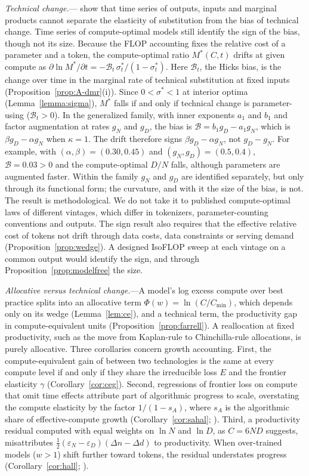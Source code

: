 \emph{Technical change.}---\citet{diamond1978measurement} show that time series of outputs, inputs and marginal
products cannot separate the elasticity of substitution from the bias of technical change. Time series of
compute-optimal models still identify the sign of the bias, though not its size. Because the FLOP accounting fixes the relative cost of a
parameter and a token, the compute-optimal ratio $M^*(C,t)$ drifts at given compute as
$\partial\ln M^*/\partial t=-\mathcal B_t\,\sigma^*_t/(1-\sigma^*_t)$. Here $\mathcal B_t$, the Hicks bias, is the
change over time in the marginal rate of technical substitution at fixed inputs (Proposition~\ref{prop:A-dmr}(i)).
Since $0<\sigma^*<1$ at interior optima (Lemma~\ref{lemma:sigma}), $M^*$ falls if and only if technical change is
parameter-using ($\mathcal B_t>0$). In the generalized family, with inner exponents $a_1$ and $b_1$ and factor augmentation at rates
$g_N$ and $g_D$, the bias is $\mathcal B=b_1g_D-a_1g_N$, which is $\beta g_D-\alpha g_N$ when $\kappa=1$. The drift
therefore signs $\beta g_D-\alpha g_N$, not $g_D-g_N$. For example, with $(\alpha,\beta)=(0.30,0.45)$ and
$(g_N,g_D)=(0.5,0.4)$, $\mathcal B=0.03>0$ and the compute-optimal $D/N$ falls, although parameters are augmented faster.
Within the family $g_N$ and $g_D$ are identified separately, but only through its functional form; the curvature, and
with it the size of the bias, is not. The result is methodological. We do not take it to published compute-optimal laws
of different vintages, which differ in tokenizers, parameter-counting conventions and outputs. The sign result also
requires that the effective relative cost of tokens not drift through data costs, data constraints or serving demand
(Proposition~\ref{prop:wedge}). A designed IsoFLOP sweep at each vintage on a common output would identify the sign,
and through Proposition~\ref{prop:modelfree} the size.

\emph{Allocative versus technical change.}---A model's log excess compute over best practice splits into an allocative
term $\Phi(w)=\ln(C/C_{\min})$, which depends only on its wedge (Lemma~\ref{lem:ce}), and a technical term, the
productivity gap in compute-equivalent units (Proposition~\ref{prop:farrell}). A reallocation at fixed productivity,
such as the move from Kaplan-rule to Chinchilla-rule allocations, is purely allocative. Three corollaries concern
growth accounting. First, the compute-equivalent gain of \citet{gundlach2025origin} between two technologies is the
same at every compute level if and only if they share the irreducible loss $E$ and the frontier elasticity $\gamma$
(Corollary~\ref{cor:ceg}). Second, regressions of frontier loss on compute that omit time effects attribute part of
algorithmic progress to scale, overstating the compute elasticity by the factor $1/(1-s_A)$, where $s_A$ is the
algorithmic share of effective-compute growth (Corollary~\ref{cor:sahal}; \citealp{nagy2013statistical}). Third, a
productivity residual computed with equal weights on $\ln N$ and $\ln D$, as $C=6ND$ suggests, misattributes
$\tfrac12(\varepsilon_N-\varepsilon_D)(\Delta n-\Delta d)$ to productivity. When over-trained models ($w>1$) shift
further toward tokens, the residual understates progress (Corollary~\ref{cor:hall}; \citealp{hall1988relation}).

